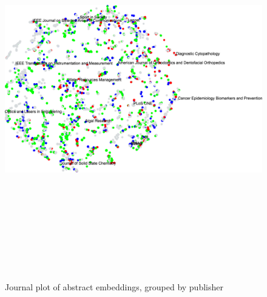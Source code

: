 \documentclass[../../Thesis.tex]{subfiles}
\begin{document}
\begin{landscape}
\begin{figure}
\begin{center}
\includegraphics[height=6.5in]{Plots/Journal_Plots/Abstract_normal}
\end{center}
\caption{Journal plot of abstract embeddings, grouped by publisher}\label{figure:abstractPlotNormal}
\end{figure}
\end{landscape}
\end{document}
